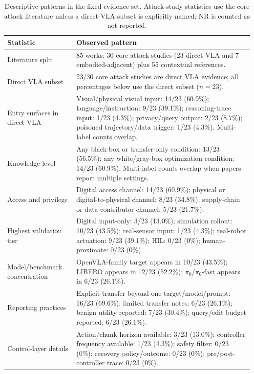 \begin{table}[t]
\centering
\scriptsize
\caption{Descriptive patterns in the fixed evidence set. Attack-study statistics use the core attack literature unless a direct-VLA subset is explicitly named; NR is counted as not reported.}
\label{tab:evidence-statistics}
\renewcommand{\arraystretch}{1.08}
\setlength{\tabcolsep}{3pt}
\begin{tabularx}{\textwidth}{@{}p{}Y@{}}
\toprule
\textbf{Statistic} & \textbf{Observed pattern} \\
\midrule
Literature split & 85 works: 30 core attack studies (23 direct VLA and 7 embodied-adjacent) plus 55 contextual references. \\
Direct VLA subset & 23/30 core attack studies are direct VLA evidence; all percentages below use the direct subset ($n=23$). \\
Entry surfaces in direct VLA & Visual/physical visual input: 14/23 (60.9\%); language/instruction: 9/23 (39.1\%); reasoning-trace input: 1/23 (4.3\%); privacy/query output: 2/23 (8.7\%); poisoned trajectory/data trigger: 1/23 (4.3\%). Multi-label counts overlap. \\
Knowledge level & Any black-box or transfer-only condition: 13/23 (56.5\%); any white/gray-box optimization condition: 14/23 (60.9\%). Multi-label counts overlap when papers report multiple settings. \\
Access and privilege & Digital access channel: 14/23 (60.9\%); physical or digital-to-physical channel: 8/23 (34.8\%); supply-chain or data-contributor channel: 5/23 (21.7\%). \\
Highest validation tier & Digital input-only: 3/23 (13.0\%); simulation rollout: 10/23 (43.5\%); real-sensor input: 1/23 (4.3\%); real-robot actuation: 9/23 (39.1\%); HIL: 0/23 (0\%); human-proximate: 0/23 (0\%). \\
Model/benchmark concentration & OpenVLA-family target appears in 10/23 (43.5\%); LIBERO appears in 12/23 (52.2\%); $\pi_0/\pi_0$-fast appears in 6/23 (26.1\%). \\
Reporting practices & Explicit transfer beyond one target/model/prompt: 16/23 (69.6\%); limited transfer notes: 6/23 (26.1\%); benign utility reported: 7/23 (30.4\%); query/edit budget reported: 6/23 (26.1\%). \\
Control-layer details & Action/chunk horizon available: 3/23 (13.0\%); controller frequency available: 1/23 (4.3\%); safety filter: 0/23 (0\%); recovery policy/outcome: 0/23 (0\%); pre/post-controller trace: 0/23 (0\%). \\
\bottomrule
\end{tabularx}
\end{table}
